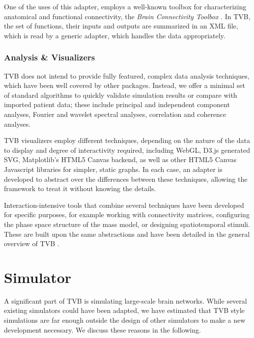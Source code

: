 \documentclass{bioinfo}
\begin{document}
One of the uses of this adapter, employs a well-known toolbox for
characterizing anatomical and functional connectivity, the \emph{Brain
Connectivity Toolbox} \citep{Rubinov_2010}.  In TVB, the set of functions,
their inputs and outputs are summarized in an XML file, which is read by a
generic adapter, which handles the data appropriately.

\subsubsection{Analysis \& Visualizers}

TVB does not intend to provide fully featured, complex data analysis
techniques, which have been well covered by other packages. 
Instead, we offer a minimal set of standard algorithms to quickly
validate simulation results or compare with imported patient data; 
these include principal and independent component analyses, 
Fourier and wavelet spectral analyses, correlation and coherence
analyses.

TVB visualizers employ different techniques, depending on the nature of
the data to display and degree of interactivity required, including WebGL,
D3.js generated SVG, Matplotlib's HTML5 Canvas backend, as well as other
HTML5 Canvas Javascript libraries for simpler, static graphs. In each case,
an adapter is developed to abstract over the differences between these
techniques, allowing the framework to treat it without knowing the details.

Interaction-intensive tools that combine several techniques have been developed
for specific purposes, for example working with connectivity matrices, 
configuring the phase space structure of the mass model, or designing
spatiotemporal stimuli. These are built upon the same abstractions and have been
detailed in the general overview of TVB \citep{Sanz-Leon_2013}.

\section{Simulator}

A significant part of TVB is simulating large-scale brain networks. While
several existing simulators could have been adapted, we have estimated that
TVB style simulations are far enough outside the design of other simulators to
make a new development necessary. We discuss these reasons in the following. 
\end{document}
